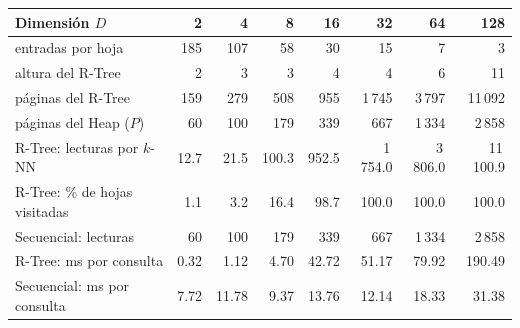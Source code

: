 \begin{tabular}{@{}lrrrrrrr@{}}
\toprule
Dimensión $D$ & 2 & 4 & 8 & 16 & 32 & 64 & 128 \\
\midrule
entradas por hoja & 185 & 107 & 58 & 30 & 15 & 7 & 3 \\
altura del R-Tree & 2 & 3 & 3 & 4 & 4 & 6 & 11 \\
páginas del R-Tree & 159 & 279 & 508 & 955 & 1\,745 & 3\,797 & 11\,092 \\
páginas del Heap ($P$) & 60 & 100 & 179 & 339 & 667 & 1\,334 & 2\,858 \\
R-Tree: lecturas por $k$-NN & 12.7 & 21.5 & 100.3 & 952.5 & 1\,754.0 & 3\,806.0 & 11\,100.9 \\
R-Tree: \% de hojas visitadas & 1.1 & 3.2 & 16.4 & 98.7 & 100.0 & 100.0 & 100.0 \\
Secuencial: lecturas & 60 & 100 & 179 & 339 & 667 & 1\,334 & 2\,858 \\
R-Tree: ms por consulta & 0.32 & 1.12 & 4.70 & 42.72 & 51.17 & 79.92 & 190.49 \\
Secuencial: ms por consulta & 7.72 & 11.78 & 9.37 & 13.76 & 12.14 & 18.33 & 31.38 \\
\bottomrule
\end{tabular}
